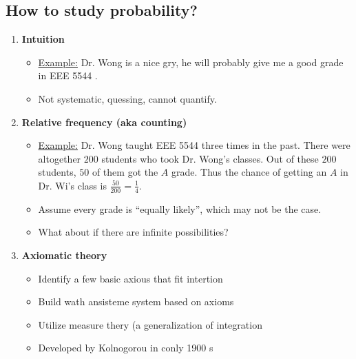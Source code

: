 \subsection{How to study probability?}
\begin{enumerate}
\item \textbf{Intuition}
\begin{itemize}
\item \underline{Example:} Dr. Wong is a nice gry, he will probably give me a good grade in EEE 5544 .
\item Not systematic, quessing, cannot quantify.
\end{itemize}

\item \textbf{Relative frequency (aka counting)} 
\begin{itemize}
\item \underline{Example:} Dr. Wong taught EEE 5544 three times in the
  past. There were altogether $200$ students who took Dr. Wong's
  classes. Out of these $200$ students, $50$ of them got the \(A\) grade.
  Thus the chance of getting an \(A\) in Dr. Wi\ong's class is
  \(\frac{50}{200}=\frac{1}{4}\).
\item Assume every grade is ``equally likely'', which may not be the case.
\item What about if there are infinite possibilities?
\end{itemize}

\item \textbf{Axiomatic theory} 
\begin{itemize}
  \item Identify a few basic axious that fit intertion
  \item Build wath ansisteme system based on axioms
  \item Utilize measure thery (a generalization of integration
  \item Developed by Kolnogorou in conly 1900 s
\end{itemize}
\end{enumerate}

